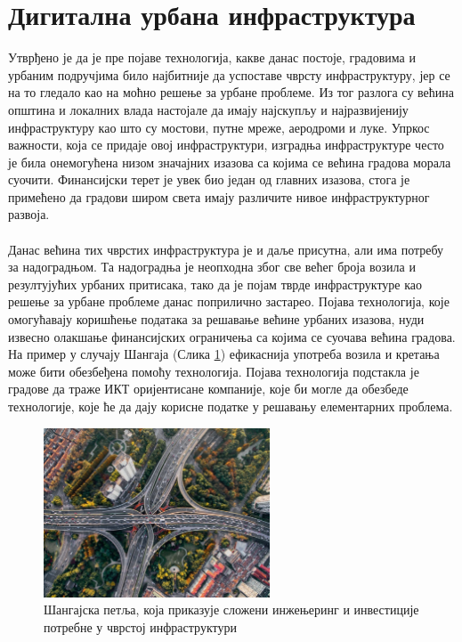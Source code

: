 \documentclass{article}
\begin{document}
\section{Дигитална урбана инфраструктура}
Утврђено је да је пре појаве технологија, какве данас постоје, градовима и урбаним подручјима било најбитније да успоставе чврсту инфраструктуру, јер се на то гледало као на моћно решење за урбане проблеме. Из тог разлога су већина општина и локалних влада настојале да имају најскупљу и најразвијенију инфраструктуру као што су мостови, путне мреже, аеродроми и луке. Упркос важности, која се придаје овој инфраструктури, изградња инфраструктуре често је била онемогућена низом значајних изазова са којима се већина градова морала суочити. Финансијски терет је увек био један од главних изазова, стога је примећено да градови широм света имају различите нивое инфраструктурног развоја. 
\\\\
Данас већина тих чврстих инфраструктура је и даље присутна, али има потребу за надоградњом. Та надоградња је неопходна због све већег броја возила и резултујућих урбаних притисака, тако да је појам тврде инфраструктуре као решење за урбане проблеме данас поприлично застарео. Појава технологија, које омогућавају коришћење података за решавање већине урбаних изазова, нуди извесно олакшање финансијских ограничења са којима се суочава већина градова. На пример у случају Шангаја (Слика \ref{fig:sangaj}) ефикаснија употреба возила и кретања може бити обезбеђена помоћу технологија. Појава технологија подстакла је градове да траже ИКТ оријентисане компаније, које би могле да обезбеде технологије, које ће да дају корисне податке у решавању елементарних проблема. \\
\begin{figure}[h!]
\centering
\includegraphics[width=0.6\textwidth]{slike/sangajska_petlja.png}
\caption{\label{fig:sangaj}Шангајска петља, која приказује сложени инжењеринг и инвестиције потребне у чврстој инфраструктури}
\end{figure} \\
\end{document}

